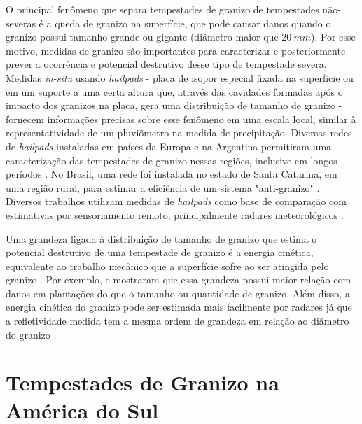 O principal fenômeno que separa tempestades de granizo de tempestades não-severas é a queda de granizo na superfície, que pode causar danos quando o granizo possui tamanho grande ou gigante (diâmetro maior que $20\:mm$). Por esse motivo, medidas de granizo são importantes para caracterizar e posteriormente prever a ocorrência e potencial destrutivo desse tipo de tempestade severa. Medidas \textit{in-situ} usando \textit{hailpads} - placa de isopor especial fixada na superfície ou em um suporte a uma certa altura que, através das cavidades formadas após o impacto dos granizos na placa, gera uma distribuição de tamanho de granizo \cite{Schleusener1960a, Decker1961} - fornecem informações precisas sobre esse fenômeno em uma escala local, similar à representatividade de um pluviômetro na medida de precipitação. Diversas redes de \textit{hailpads} instaladas em países da Europa \cite{Dessens1998, Svabik1989, Giaiotti2003, Pocakal2009, Berthet2011} e na Argentina \cite{Sanchez2009} permitiram uma caracterização das tempestades de granizo nessas regiões, inclusive em longos períodos \cite{Berthet2013}. No Brasil, uma rede foi instalada no estado de Santa Catarina, em uma região rural, para estimar a eficiência de um sistema "anti-granizo" \cite{Iliine2010}. Diversos trabalhos utilizam medidas de \textit{hailpads} como base de comparação com estimativas por sensoriamento remoto, principalmente radares meteorológicos \cite{Waldvogel1978a, Schmid1992, Sanchez2013}.

Uma grandeza ligada à distribuição de tamanho de granizo que estima o potencial destrutivo de uma tempestade de granizo é a energia cinética, equivalente ao trabalho mecânico que a superfície sofre ao ser atingida pelo granizo \cite{Martins2017}. Por exemplo,  e \cite{Morgan1976} mostraram que essa grandeza possui maior relação com danos em plantações do que o tamanho ou quantidade de granizo. Além disso, a energia cinética do granizo pode ser estimada mais facilmente por radares já que a refletividade medida tem a mesma ordem de grandeza em relação ao diâmetro do granizo \cite{Waldvogel1978a}.

\section{Tempestades de Granizo na América do Sul}

